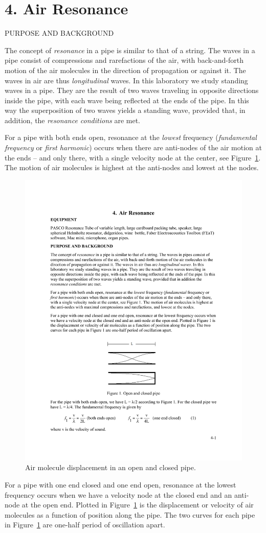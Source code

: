 \documentclass[11pt]{NSF}
\begin{document}
     
\section{4. Air Resonance}

PURPOSE AND BACKGROUND

The concept of {\em resonance} in a pipe is similar to that of a string. The waves in
a pipe consist of compressions and rarefactions of the air, with back-and-forth
motion of the air molecules in the direction of propagation or against it. The
waves in air are thus {\em longitudinal} waves. In this laboratory we study standing
waves in a pipe. They are the result of two waves traveling in opposite
directions inside the pipe, with each wave being reflected at the ends of the
pipe. In this way the superposition of two waves yields a standing wave,
provided that, in addition, the {\em resonance conditions} are met.

For a pipe with both ends open, resonance at the {\em lowest} frequency 
({\em fundamental frequency} or {\em first harmonic}) 
occurs when there are anti-nodes of the air motion
at the ends – and only there, with a single velocity node at the center, see
Figure~\ref{f:1}. 
The motion of air molecules is highest at the anti-nodes and lowest at the nodes.
%
\begin{figure}[hbtp]
\begin{center}
\includegraphics[width=.4\textwidth]{fig4_1}
\caption{Air molecule displacement in an open and closed pipe.}
\label{f:1} 
\end{center} 
\end{figure}
%
For a pipe with one end closed and one end open, resonance at the lowest
frequency occurs when we have a velocity node at the closed end and an
anti-node at the open end. Plotted in Figure~\ref{f:1} is the displacement or velocity
of air molecules as a function of position along the pipe. The two curves for
each pipe in Figure~\ref{f:1} are one-half period of oscillation apart.
\end{document}
